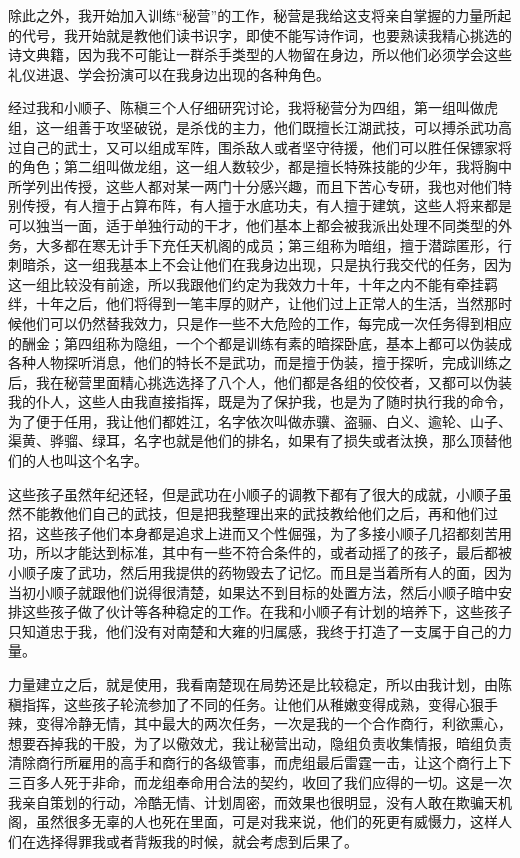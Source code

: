 除此之外，我开始加入训练“秘营”的工作，秘营是我给这支将亲自掌握的力量所起的代号，我开始就是教他们读书识字，即使不能写诗作词，也要熟读我精心挑选的诗文典籍，因为我不可能让一群杀手类型的人物留在身边，所以他们必须学会这些礼仪进退、学会扮演可以在我身边出现的各种角色。

经过我和小顺子、陈稹三个人仔细研究讨论，我将秘营分为四组，第一组叫做虎组，这一组善于攻坚破锐，是杀伐的主力，他们既擅长江湖武技，可以搏杀武功高过自己的武士，又可以组成军阵，围杀敌人或者坚守待援，他们可以胜任保镖家将的角色；第二组叫做龙组，这一组人数较少，都是擅长特殊技能的少年，我将胸中所学列出传授，这些人都对某一两门十分感兴趣，而且下苦心专研，我也对他们特别传授，有人擅于占算布阵，有人擅于水底功夫，有人擅于建筑，这些人将来都是可以独当一面，适于单独行动的干才，他们基本上都会被我派出处理不同类型的外务，大多都在寒无计手下充任天机阁的成员；第三组称为暗组，擅于潜踪匿形，行刺暗杀，这一组我基本上不会让他们在我身边出现，只是执行我交代的任务，因为这一组比较没有前途，所以我跟他们约定为我效力十年，十年之内不能有牵挂羁绊，十年之后，他们将得到一笔丰厚的财产，让他们过上正常人的生活，当然那时候他们可以仍然替我效力，只是作一些不大危险的工作，每完成一次任务得到相应的酬金；第四组称为隐组，一个个都是训练有素的暗探卧底，基本上都可以伪装成各种人物探听消息，他们的特长不是武功，而是擅于伪装，擅于探听，完成训练之后，我在秘营里面精心挑选选择了八个人，他们都是各组的佼佼者，又都可以伪装我的仆人，这些人由我直接指挥，既是为了保护我，也是为了随时执行我的命令，为了便于任用，我让他们都姓江，名字依次叫做赤骥、盗骊、白义、逾轮、山子、渠黄、骅骝、绿耳，名字也就是他们的排名，如果有了损失或者汰换，那么顶替他们的人也叫这个名字。

这些孩子虽然年纪还轻，但是武功在小顺子的调教下都有了很大的成就，小顺子虽然不能教他们自己的武技，但是把我整理出来的武技教给他们之后，再和他们过招，这些孩子他们本身都是追求上进而又个性倔强，为了多接小顺子几招都刻苦用功，所以才能达到标准，其中有一些不符合条件的，或者动摇了的孩子，最后都被小顺子废了武功，然后用我提供的药物毁去了记忆。而且是当着所有人的面，因为当初小顺子就跟他们说得很清楚，如果达不到目标的处置方法，然后小顺子暗中安排这些孩子做了伙计等各种稳定的工作。在我和小顺子有计划的培养下，这些孩子只知道忠于我，他们没有对南楚和大雍的归属感，我终于打造了一支属于自己的力量。

力量建立之后，就是使用，我看南楚现在局势还是比较稳定，所以由我计划，由陈稹指挥，这些孩子轮流参加了不同的任务。让他们从稚嫩变得成熟，变得心狠手辣，变得冷静无情，其中最大的两次任务，一次是我的一个合作商行，利欲熏心，想要吞掉我的干股，为了以儆效尤，我让秘营出动，隐组负责收集情报，暗组负责清除商行所雇用的高手和商行的各级管事，而虎组最后雷霆一击，让这个商行上下三百多人死于非命，而龙组奉命用合法的契约，收回了我们应得的一切。这是一次我亲自策划的行动，冷酷无情、计划周密，而效果也很明显，没有人敢在欺骗天机阁，虽然很多无辜的人也死在里面，可是对我来说，他们的死更有威慑力，这样人们在选择得罪我或者背叛我的时候，就会考虑到后果了。

